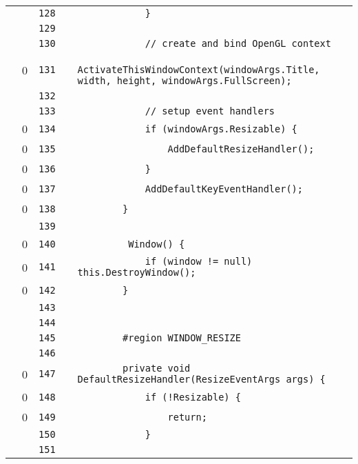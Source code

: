 \documentclass[a4paper,landscape,10pt]{article}
\begin{document}
\begin{longtable}[l]{lrrll}
\cellcolor{gray} &  & \verb~128~ & & \verb~            }~\\
\cellcolor{gray} &  & \verb~129~ & & \verb~~\\
\cellcolor{gray} &  & \verb~130~ & & \verb~            // create and bind OpenGL context~\\
\cellcolor{red} & 0 & \verb~131~ & & \verb~            ActivateThisWindowContext(windowArgs.Title, width, height, windowArgs.FullScreen);~\\
\cellcolor{gray} &  & \verb~132~ & & \verb~~\\
\cellcolor{gray} &  & \verb~133~ & & \verb~            // setup event handlers~\\
\cellcolor{red} & 0 & \verb~134~ & & \verb~            if (windowArgs.Resizable) {~\\
\cellcolor{red} & 0 & \verb~135~ & & \verb~                AddDefaultResizeHandler();~\\
\cellcolor{red} & 0 & \verb~136~ & & \verb~            }~\\
\cellcolor{red} & 0 & \verb~137~ & & \verb~            AddDefaultKeyEventHandler();~\\
\cellcolor{red} & 0 & \verb~138~ & & \verb~        }~\\
\cellcolor{gray} &  & \verb~139~ & & \verb~~\\
\cellcolor{red} & 0 & \verb~140~ & & \verb~         Window() {~\\
\cellcolor{red} & 0 & \verb~141~ & & \verb~            if (window != null) this.DestroyWindow();~\\
\cellcolor{red} & 0 & \verb~142~ & & \verb~        }~\\
\cellcolor{gray} &  & \verb~143~ & & \verb~~\\
\cellcolor{gray} &  & \verb~144~ & & \verb~~\\
\cellcolor{gray} &  & \verb~145~ & & \verb~        #region WINDOW_RESIZE~\\
\cellcolor{gray} &  & \verb~146~ & & \verb~~\\
\cellcolor{red} & 0 & \verb~147~ & & \verb~        private void DefaultResizeHandler(ResizeEventArgs args) {~\\
\cellcolor{red} & 0 & \verb~148~ & & \verb~            if (!Resizable) {~\\
\cellcolor{red} & 0 & \verb~149~ & & \verb~                return;~\\
\cellcolor{gray} &  & \verb~150~ & & \verb~            }~\\
\cellcolor{gray} &  & \verb~151~ & & \verb~~\\

\end{longtable}
\end{document}
